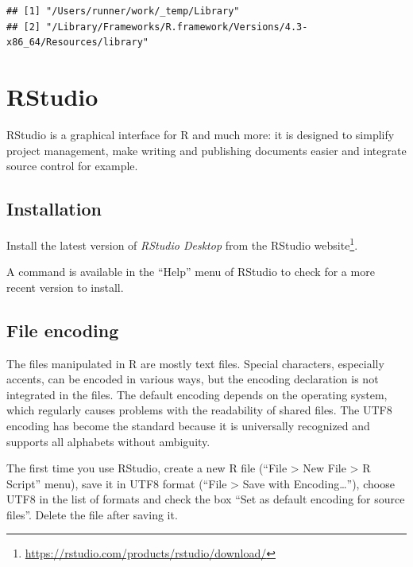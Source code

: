 \documentclass[
  12pt,
  american,
  a4paper,
  extrafontsizes,onecolumn,openright
  ]{memoir}
\newlength{\rf}
\begin{document}
\begin{verbatim}
## [1] "/Users/runner/work/_temp/Library"                                     
## [2] "/Library/Frameworks/R.framework/Versions/4.3-x86_64/Resources/library"
\end{verbatim}

\normalsize

\hypertarget{rstudio}{%
\section{RStudio}\label{rstudio}}

RStudio is a graphical interface for R and much more: it is designed to simplify project management, make writing and publishing documents easier and integrate source control for example.

\hypertarget{installation-1}{%
\subsection{Installation}\label{installation-1}}

Install the latest version of \emph{RStudio Desktop} from the RStudio website\footnote{\url{https://rstudio.com/products/rstudio/download/}}.

A command is available in the \enquote{Help} menu of RStudio to check for a more recent version to install.

\hypertarget{file-encoding}{%
\subsection{File encoding}\label{file-encoding}}

The files manipulated in R are mostly text files.
Special characters, especially accents, can be encoded in various ways, but the encoding declaration is not integrated in the files.
The default encoding depends on the operating system, which regularly causes problems with the readability of shared files.
The UTF8 encoding has become the standard because it is universally recognized and supports all alphabets without ambiguity.

The first time you use RStudio, create a new R file (\enquote{File \textgreater{} New File \textgreater{} R Script} menu), save it in UTF8 format (\enquote{File \textgreater{} Save with Encoding\ldots{}}), choose UTF8 in the list of formats and check the box \enquote{Set as default encoding for source files}.
Delete the file after saving it.
\end{document}
